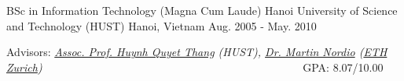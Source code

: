 \begin{cventries}
  \cventry
  { BSc in Information Technology (Magna Cum Laude)} %
  {Hanoi University of Science and Technology (HUST)} %
  {Hanoi, Vietnam} %
  {Aug. 2005 - May. 2010} %
  {
  	\begin{cvitems} %
	  	\item Advisors: {\em \href{http://www.soict.hut.edu.vn/~thanghq/}{Assoc. Prof. Huynh Quyet Thang}  (HUST), \href{http://se.inf.ethz.ch/people/nordio/}{Dr. Martin Nordio} (\href {http://se.inf.ethz.ch/}{ETH Zurich}) ~~~~~~~~~~~~~~~~~~~~~~~~~~~~~~~~~~~~~~~~~~~~~} GPA: 8.07/10.00 
  	\end{cvitems}
  }  

\end{cventries}




